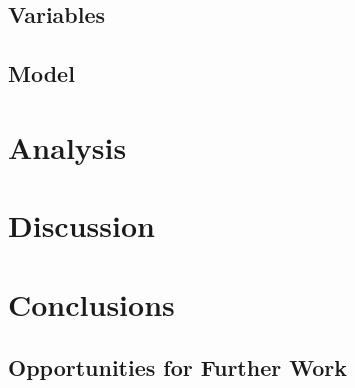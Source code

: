 \documentclass[12pt]{article}
\begin{document}
\subsection{Variables}

\subsection{Model}


	\section{Analysis}





	\section{Discussion}



	\section{Conclusions}


\subsection{Opportunities for Further Work}
\end{document}
